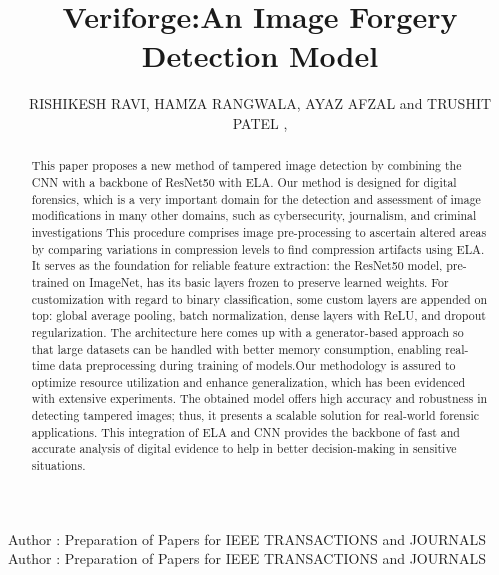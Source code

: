 \documentclass{ieeeaccess}
\begin{document}

\title{Veriforge:An Image Forgery Detection Model}
\author{\uppercase{Rishikesh Ravi},
\uppercase{Hamza Rangwala},
\uppercase{Ayaz Afzal} and \uppercase{Trushit Patel} ,
}

\address[1]{Wilfrid Laurier University, Waterloo ON Canada (email:rish8180@mylaurier.ca)}
\address[2]{Wilfrid Laurier University, Waterloo ON Canada (email:rang8720@mylaurier.ca)}
\address[3]{Wilfrid Laurier University, Waterloo ON Canada (email:afza9880@mylaurier.ca)}
\address[4]{Wilfrid Laurier University, Waterloo ON Canada (email:pate9410@mylaurier.ca)}


\markboth
{Author \headeretal: Preparation of Papers for IEEE TRANSACTIONS and JOURNALS}
{Author \headeretal: Preparation of Papers for IEEE TRANSACTIONS and JOURNALS}



\begin{abstract}
This paper proposes a new method of tampered image detection by combining the CNN with a backbone of ResNet50 with ELA. Our method is designed for digital forensics, which is a very important domain for the detection and assessment of image modifications in many other domains, such as cybersecurity, journalism, and criminal investigations This procedure comprises image pre-processing to ascertain altered areas by comparing variations in compression levels to find compression artifacts using ELA. It serves as the foundation for reliable feature extraction: the ResNet50 model, pre-trained on ImageNet, has its basic layers frozen to preserve learned weights.
For customization with regard to binary classification, some custom layers are appended on top: global average pooling, batch normalization, dense layers with ReLU, and dropout regularization. The architecture here comes up with a generator-based approach so that large datasets can be handled with better memory consumption, enabling real-time data preprocessing during training of models.Our methodology is assured to optimize resource utilization and enhance generalization, which has been evidenced with extensive experiments. The obtained model offers high accuracy and robustness in detecting tampered images; thus, it presents a scalable solution for real-world forensic applications. This integration of ELA and CNN provides the backbone of fast and accurate analysis of digital evidence to help in better decision-making in sensitive situations.
\end{abstract}
\end{document}
